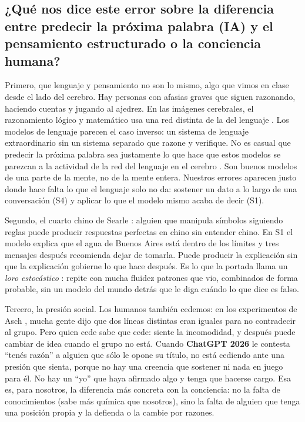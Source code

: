 \documentclass[11pt,a4paper]{article}
\newcommand{\nuevo}{\textcolor{nuevo}{\textbf{ChatGPT 2026}}}
\begin{document}
\subsection*{¿Qué nos dice este error sobre la diferencia entre predecir la próxima palabra (IA) y el pensamiento estructurado o la conciencia humana?}

Primero, que lenguaje y pensamiento no son lo mismo, algo que vimos en clase desde el lado del cerebro. Hay personas con afasias graves que siguen razonando, haciendo cuentas y jugando al ajedrez. En las imágenes cerebrales, el razonamiento lógico y matemático usa una red distinta de la del lenguaje \cite{fedorenko}. Los modelos de lenguaje parecen el caso inverso: un sistema de lenguaje extraordinario sin un sistema separado que razone y verifique. No es casual que predecir la próxima palabra sea justamente lo que hace que estos modelos se parezcan a la actividad de la red del lenguaje en el cerebro \cite{schrimpf}. Son buenos modelos de una parte de la mente, no de la mente entera. Nuestros errores aparecen justo donde hace falta lo que el lenguaje solo no da: sostener un dato a lo largo de una conversación (S4) y aplicar lo que el modelo mismo acaba de decir (S1).

Segundo, el cuarto chino de Searle \cite{searle}: alguien que manipula símbolos siguiendo reglas puede producir respuestas perfectas en chino sin entender chino. En S1 el modelo explica que el agua de Buenos Aires está dentro de los límites y tres mensajes después recomienda dejar de tomarla. Puede producir la explicación sin que la explicación gobierne lo que hace después. Es lo que la portada llama un \emph{loro estocástico} \cite{bender}: repite con mucha fluidez patrones que vio, combinados de forma probable, sin un modelo del mundo detrás que le diga cuándo lo que dice es falso.

Tercero, la presión social. Los humanos también cedemos: en los experimentos de Asch \cite{asch}, mucha gente dijo que dos líneas distintas eran iguales para no contradecir al grupo. Pero quien cede sabe que cede: siente la incomodidad, y después puede cambiar de idea cuando el grupo no está. Cuando \nuevo{} le contesta \enquote{tenés razón} a alguien que sólo le opone su título, no está cediendo ante una presión que sienta, porque no hay una creencia que sostener ni nada en juego para él. No hay un \enquote{yo} que haya afirmado algo y tenga que hacerse cargo. Esa es, para nosotros, la diferencia más concreta con la conciencia: no la falta de conocimientos (sabe más química que nosotros), sino la falta de alguien que tenga una posición propia y la defienda o la cambie por razones.
\end{document}
